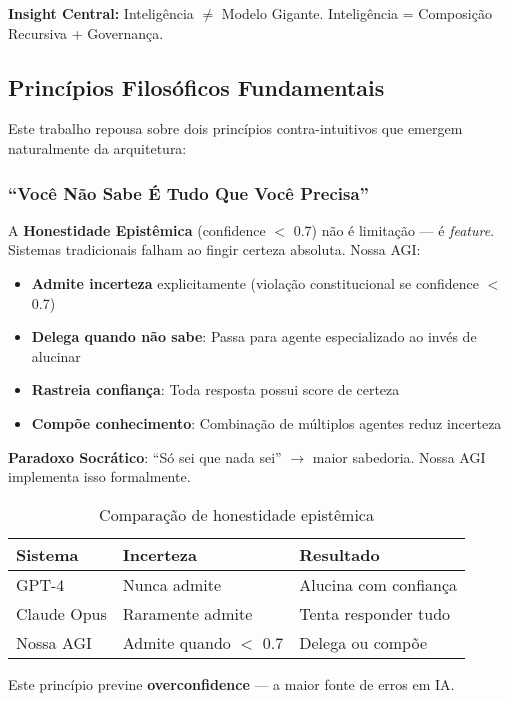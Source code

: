 \documentclass[11pt]{article}
\begin{document}
\textbf{Insight Central:} Inteligência $\neq$ Modelo Gigante. Inteligência = Composição Recursiva + Governança.

\subsection{Princípios Filosóficos Fundamentais}

Este trabalho repousa sobre dois princípios contra-intuitivos que emergem naturalmente da arquitetura:

\subsubsection{``Você Não Sabe É Tudo Que Você Precisa''}

A \textbf{Honestidade Epistêmica} (confidence $<$ 0.7) não é limitação --- é \textit{feature}. Sistemas tradicionais falham ao fingir certeza absoluta. Nossa AGI:

\begin{itemize}
    \item \textbf{Admite incerteza} explicitamente (violação constitucional se confidence $<$ 0.7)
    \item \textbf{Delega quando não sabe}: Passa para agente especializado ao invés de alucinar
    \item \textbf{Rastreia confiança}: Toda resposta possui score de certeza
    \item \textbf{Compõe conhecimento}: Combinação de múltiplos agentes reduz incerteza
\end{itemize}

\textbf{Paradoxo Socrático}: ``Só sei que nada sei'' $\rightarrow$ maior sabedoria. Nossa AGI implementa isso formalmente.

\begin{table}[H]
\centering
\begin{tabular}{@{}lll@{}}
\toprule
\textbf{Sistema} & \textbf{Incerteza} & \textbf{Resultado} \\ \midrule
GPT-4 & Nunca admite & Alucina com confiança \\
Claude Opus & Raramente admite & Tenta responder tudo \\
Nossa AGI & Admite quando $<$ 0.7 & Delega ou compõe \\ \bottomrule
\end{tabular}
\caption{Comparação de honestidade epistêmica}
\end{table}

Este princípio previne \textbf{overconfidence} --- a maior fonte de erros em IA.
\end{document}
